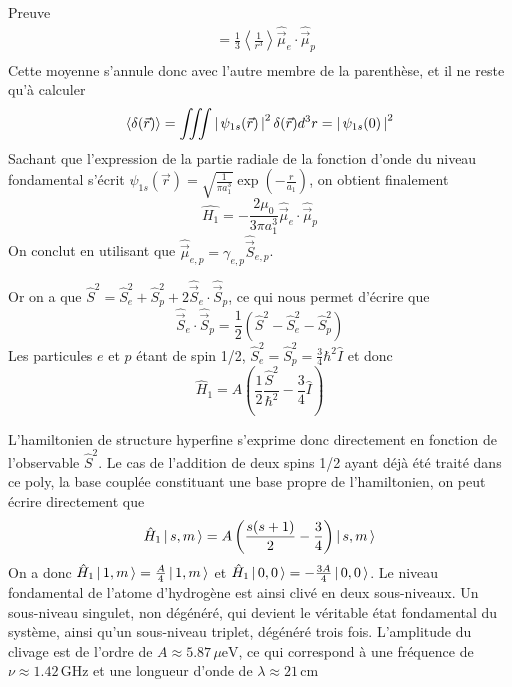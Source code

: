 \begin{demo}{Preuve}
\begin{align*}
                &= \frac{1}{3} \left<\frac{1}{r^3}\right> \hat{\vec{\mu}}_e \cdot \hat{\vec{\mu}}_p \\
            \end{align*}
            Cette moyenne s’annule donc avec l’autre membre de la parenthèse, et il ne reste qu’à calculer 
            \[ \left<\delta(\vec{r})\right> = \iiint \left\lvert \, \psi_{1s}(\vec{r}) \, \right\rvert^2\delta(\vec{r}) d^3r = \left\lvert \, \psi_{1s}(0) \, \right\rvert^2 \]
            Sachant que l’expression de la partie radiale de la fonction d’onde du niveau fondamental s’écrit $\psi_{1s}(\vec{r}) = \sqrt{\frac{1}{\pi a_1^3}} \exp\left(-\frac{r}{a_1}\right)$, on obtient finalement 
            \[ \hat{H_1} = - \frac{2\mu_0}{3\pi a_1^3} \hat{\vec{\mu}}_e \cdot \hat{\vec{\mu}}_p \]
            On conclut en utilisant que $\hat{\vec{\mu}}_{e,p} = \gamma_{e,p} \hat{\vec{S}}_{e,p}$.

            Or on a que $\hat{S}^2 = \hat{S}^2_e + \hat{S}^2_p + 2 \hat{\vec{S}}_e \cdot \hat{\vec{S}}_p$, ce qui nous permet d’écrire que 
            \[ \hat{\vec{S}}_e \cdot \hat{\vec{S}}_p = \frac{1}{2} \left(\hat{S}^2 - \hat{S}^2_e - \hat{S}^2_p\right) \]
            Les particules $e$ et $p$ étant de spin 1/2, $\hat{S}_e^2 = \hat{S}_p^2 = \frac{3}{4} \hbar^2 \hat{I}$ et donc 
            \[ \hat{H}_1 = A \left(\frac{1}{2} \frac{\hat{S}^2}{\hbar^2} - \frac{3}{4}\hat{I}\right) \]  
        \end{demo}
          
        L’hamiltonien de structure hyperfine s’exprime donc directement en fonction de l’observable $\hat{S}^2$. Le cas de l’addition de deux spins 1/2 ayant déjà été traité dans ce poly, la base couplée constituant une base propre de l’hamiltonien, on peut écrire directement que 
        \[ \hat{H}_1 \left| \, s,m \, \right> = A \left(\frac{s(s+1)}{2} - \frac{3}{4}\right) \left| \, s,m \, \right> \]   
        On a donc $\hat{H}_1 \left| \, 1,m \, \right> = \frac{A}{4} \left| \, 1,m \, \right>$ et $\hat{H}_1 \left| \, 0,0 \, \right> = - \frac{3A}{4} \left| \, 0,0 \, \right>$. Le niveau fondamental de l’atome d’hydrogène est ainsi clivé en deux sous-niveaux. Un sous-niveau singulet, non dégénéré, qui devient le véritable état fondamental du système, ainsi qu’un sous-niveau triplet, dégénéré trois fois. L’amplitude du clivage est de l’ordre de $A \approx 5.87 \, \mu\text{eV}$, ce qui correspond à une fréquence de $\nu \approx 1.42 \, \text{GHz}$ et une longueur d’onde de $\lambda \approx 21 \, \text{cm}$




    

    

    
